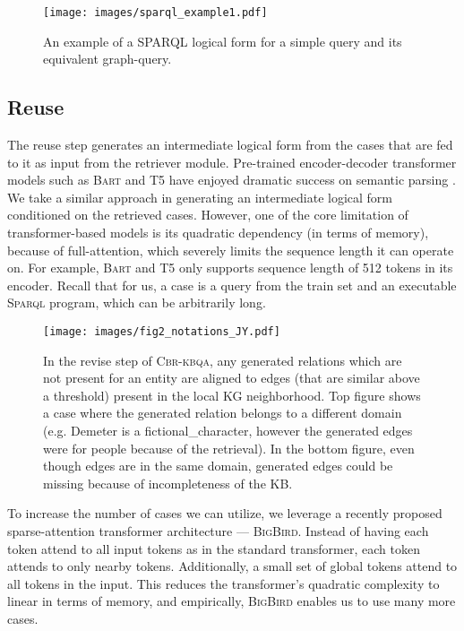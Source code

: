 \documentclass{article}
\newcommand{\bigb}{\textsc{BigBird}\xspace}
\newcommand{\spql}{\textsc{Sparql}\xspace}
\newcommand{\alg}{\textsc{Cbr-kbqa}\xspace}
\begin{document}
\begin{figure}
    \centering
    \texttt{[image: images/sparql\_example1.pdf]}
    \vspace{-5mm}
    \caption{An example of a SPARQL logical form for a simple query and its equivalent graph-query.}
    \label{fig:sparql_example}
\end{figure}

\subsection{Reuse}
\label{sub:reuse}
The reuse step generates an intermediate logical form from the  cases that are fed to it as input from the retriever module. Pre-trained encoder-decoder transformer models such as \textsc{Bart} \cite{lewis-etal-2020-bart} and T5 \cite{t5} have enjoyed dramatic success on semantic parsing \cite{lin2018nl2bash,hwang2019comprehensive,shaw2020compositional,suhr2020exploring}. We take a similar approach in generating an intermediate logical form conditioned on the retrieved cases. However, one of the core limitation of transformer-based models is its quadratic dependency (in terms of memory), because of full-attention, which severely limits the sequence length it can operate on. For example, \textsc{Bart} and T5 only supports sequence length of 512 tokens in its encoder. Recall that for us, a case is a query from the train set and an executable \spql program, which can be arbitrarily long.   

\begin{figure*}
    \centering
    \texttt{[image: images/fig2\_notations\_JY.pdf]}
    \vspace{-3mm}
    \caption{In the revise step of \alg, any generated relations which are not present for an entity are aligned to edges (that are similar above a threshold) present in the local KG neighborhood. Top figure shows a case where the generated relation belongs to a different domain (e.g. Demeter is a \textsf{fictional\_character}, however the generated edges were for \textsf{people} because of the retrieval). In the bottom figure, even though edges are in the same domain, generated edges could be missing because of incompleteness of the KB.}
    \label{fig:intro2}
\end{figure*}

To increase the number of cases we can utilize, we leverage a recently proposed sparse-attention transformer architecture --- \bigb \cite{zaheer2020big}. Instead of having each token attend to all input tokens as in the standard transformer, each token attends to only nearby tokens. Additionally, a small set of global tokens attend to all tokens in the input. This reduces the transformer's quadratic complexity to linear in terms of memory, and empirically, \bigb enables us to use many more cases.
\end{document}
